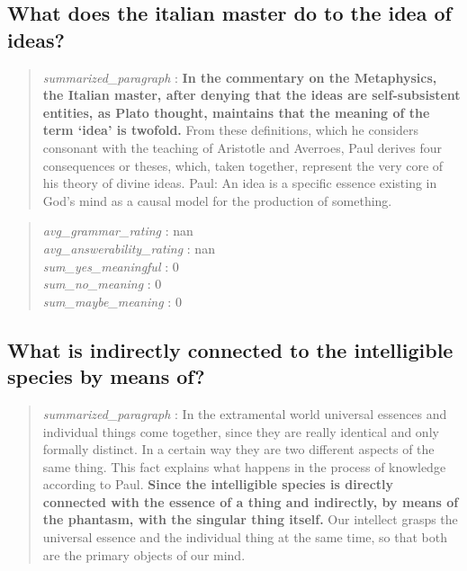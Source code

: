 \hypertarget{what-does-the-italian-master-do-to-the-idea-of-ideas}{%
\subsection{What does the italian master do to the idea of
ideas?}\label{what-does-the-italian-master-do-to-the-idea-of-ideas}}

\begin{quote}
\emph{summarized\_paragraph} : \textbf{In the commentary on the
Metaphysics, the Italian master, after denying that the ideas are
self-subsistent entities, as Plato thought, maintains that the meaning
of the term `idea' is twofold.} From these definitions, which he
considers consonant with the teaching of Aristotle and Averroes, Paul
derives four consequences or theses, which, taken together, represent
the very core of his theory of divine ideas. Paul: An idea is a specific
essence existing in God's mind as a causal model for the production of
something.
\end{quote}

\begin{quote}
\emph{avg\_grammar\_rating} : nan\\
\emph{avg\_answerability\_rating} : nan\\
\emph{sum\_yes\_meaningful} : 0\\
\emph{sum\_no\_meaning} : 0\\
\emph{sum\_maybe\_meaning} : 0
\end{quote}

\hypertarget{what-is-indirectly-connected-to-the-intelligible-species-by-means-of}{%
\subsection{What is indirectly connected to the intelligible species by
means
of?}\label{what-is-indirectly-connected-to-the-intelligible-species-by-means-of}}

\begin{quote}
\emph{summarized\_paragraph} : In the extramental world universal
essences and individual things come together, since they are really
identical and only formally distinct. In a certain way they are two
different aspects of the same thing. This fact explains what happens in
the process of knowledge according to Paul. \textbf{Since the
intelligible species is directly connected with the essence of a thing
and indirectly, by means of the phantasm, with the singular thing
itself.} Our intellect grasps the universal essence and the individual
thing at the same time, so that both are the primary objects of our
mind.
\end{quote}


